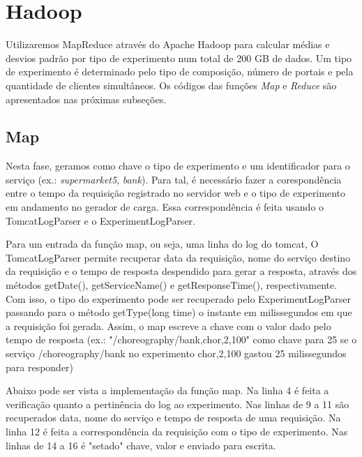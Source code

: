 \documentclass[brazil, a4paper,12pt]{article}
\begin{document}
\section{Hadoop}

Utilizaremos MapReduce através do Apache Hadoop para calcular médias e desvios padrão por tipo de experimento num total de 200 GB de dados. Um tipo de experimento é determinado pelo tipo de composição, número de portais e pela quantidade de clientes simultâneos. Os códigos das funções \emph{Map} e \emph{Reduce} são apresentados nas próximas subseções.

\subsection{Map}

Nesta fase, geramos como chave o tipo de experimento e um identificador para o serviço (ex.: \emph{supermarket5}, \emph{bank}). Para tal, é necessário fazer a corespondência entre o tempo da requisição registrado no servidor web e o tipo de experimento em andamento no gerador de carga. Essa correspondência é feita usando o TomcatLogParser e o ExperimentLogParser.

Para um entrada da função map, ou seja, uma linha do log do tomcat, O TomcatLogParser permite recuperar data da requisição, nome do serviço destino da requisição e o tempo de resposta despendido para gerar a resposta, através dos métodos getDate(), getServiceName() e getResponseTime(), respectivamente. Com isso, o tipo do experimento pode ser recuperado pelo ExperimentLogParser passando para o método getType(long time) o instante em milissegundos em que a requisição foi gerada. Assim, o map escreve a chave com o valor dado pelo tempo de resposta (ex.: "/choreography/bank,chor,2,100" como chave para 25 se o serviço /choreography/bank no experimento chor,2,100 gastou 25 milissegundos para responder) 

Abaixo pode ser vista a implementação da função map. Na linha 4 é feita a verificação quanto a pertinência do log ao experimento. Nas linhas de 9 a 11 são recuperados data, nome do serviço e tempo de resposta de uma requisição. Na linha 12 é feita a correspondência da requisição com o tipo de experimento. Nas linhas de 14 a 16 é "setado" chave, valor e enviado para escrita.
\end{document}
